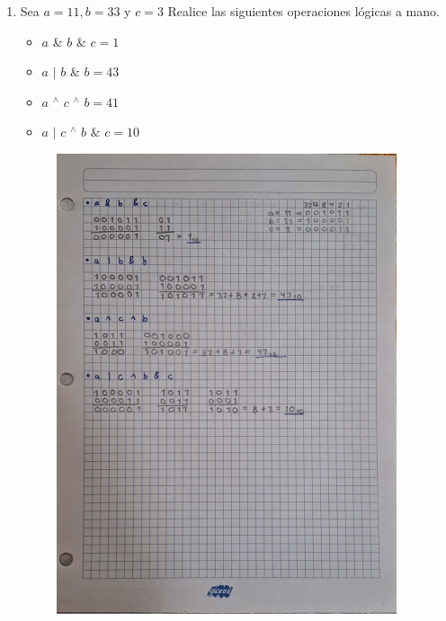 \documentclass[12pt]{article}
\begin{document}
\begin{enumerate}[leftmargin=*]
        \newpage
        \item Sea $a = 11 , b = 33$ y $c = 3$ Realice las siguientes operaciones lógicas a mano.
        \begin{itemize}[leftmargin=*]
            \item $a$ \& $b$ \& $c = 1$
            \item $a$ $\mid$ $b$ \& $b = 43$ 
            \item $a$ $^{\wedge}$ $c$ $^{\wedge}$ $b = 41$
            \item $a$ $\mid$ $c$ $^{\wedge}$ $b$ $\&$ $c = 10 $
        \end{itemize}
        \begin{figure}[ht]
            \includegraphics[width = 10cm, center]{E2.jpg}
        \end{figure}


\end{enumerate}
\end{document}
